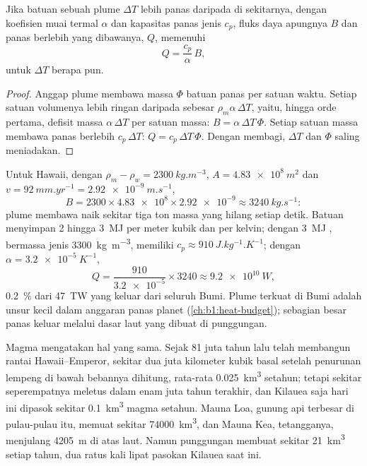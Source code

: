\begin{proposition}\label{prop:b1:hotspots:heat}
Jika batuan sebuah plume $\Delta T$ lebih panas daripada  di sekitarnya, dengan koefisien muai termal $\alpha$ dan kapasitas panas jenis $c_p$, fluks daya apungnya $B$ dan panas berlebih yang dibawanya, $Q$, memenuhi
\[
  Q = \frac{c_p}{\alpha}\,B ,
\]
untuk $\Delta T$ berapa pun.
\end{proposition}

\begin{proof}
Anggap plume membawa massa $\Phi$ batuan panas per satuan waktu. Setiap satuan volumenya lebih ringan daripada  sebesar $\rho_m\alpha\,\Delta T$, yaitu, hingga orde pertama, defisit massa $\alpha\,\Delta T$ per satuan massa: $B =
\alpha\,\Delta T\,\Phi$. Setiap satuan massa membawa panas berlebih $c_p\,\Delta T$: $Q = c_p\,\Delta T\,\Phi$. Dengan membagi, $\Delta T$ dan $\Phi$
saling meniadakan.
\end{proof}

Untuk Hawaii, dengan $\rho_m - \rho_w = \qty{2300}{kg.m^{-3}}$, $A =
\qty{4.83e8}{m^2}$ dan $v = \qty{92}{mm.yr^{-1}} = \qty{2.92e-9}{m.s^{-1}}$,
\[
  B = 2300\times\num{4.83e8}\times\num{2.92e-9} \approx \qty{3240}{kg.s^{-1}}:
\]
plume membawa naik sekitar tiga ton massa yang hilang setiap detik. Batuan
menyimpan 2 hingga \qty{3}{MJ} per meter kubik dan per kelvin; dengan \qty{3}{MJ} ,
bermassa jenis \qty{3300}{kg.m^{-3}}, memiliki
$c_p \approx \qty{910}{J.kg^{-1}.K^{-1}}$;
dengan $\alpha = \qty{3.2e-5}{K^{-1}}$,
\[
  Q = \frac{910}{\num{3.2e-5}}\times3240 \approx \qty{9.2e10}{W},
\]
\qty{0.2}{\percent} dari \qty{47}{TW} yang keluar dari seluruh Bumi. Plume terkuat di Bumi
adalah unsur kecil dalam anggaran panas planet (\cref{ch:b1:heat-budget}); sebagian besar panas
keluar melalui dasar laut yang dibuat di punggungan.

Magma mengatakan hal yang sama. Sejak 81 juta tahun lalu  telah membangun rantai
Hawaii--Emperor, sekitar dua juta kilometer kubik basal setelah penurunan lempeng di bawah
bebannya dihitung, rata-rata \qty{0.025}{km^3} setahun; tetapi sekitar seperempatnya meletus
dalam enam juta tahun terakhir, dan Kilauea saja hari ini dipasok sekitar \qty{0.1}{km^3} magma
setahun. Mauna Loa, gunung api terbesar di pulau-pulau itu, memuat sekitar \qty{74000}{km^3}, dan
Mauna Kea, tetangganya, menjulang \qty{4205}{m} di atas laut. Namun punggungan membuat sekitar
\qty{21}{km^3}  setiap tahun, dua ratus kali lipat pasokan Kilauea saat ini.

